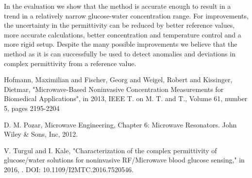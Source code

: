 \documentclass[10pt,final,conference,a4paper,twocolumn]{IEEEtran_AntennEMB_GigaHertz2016}
\begin{document}
In the evaluation we show that the method is accurate enough to result in a trend in a relatively narrow glucose-water concentration range. For improvements, the uncertainty in the permittivity can be reduced by better reference values, more accurate calculations, better concentration and temperature control and a more rigid setup. Despite the many possible improvements we believe that the method as it is can successfully be used to detect anomalies and deviations in complex permittivity from a reference value.







%
%


\begin{thebibliography}{99}
	
	
	
	 Hofmann, Maximilian and Fischer, Georg and Weigel, Robert and Kissinger, Dietmar, "Microwave-Based Noninvasive Concentration Measurements for Biomedical Applications", in 2013, IEEE T. on M. T. and T., Volume 61, number 5, pages 2195-2204
	
	 D. M. Pozar, Microwave Engineering, Chapter 6: Microwave Resonators. John Wiley \& Sons,
	Inc, 2012.
	
	 V. Turgul and I. Kale, "Characterization of the complex permittivity of glucose/water solutions for noninvasive RF/Microwave blood glucose sensing," in 2016, . DOI: 10.1109/I2MTC.2016.7520546.
\end{thebibliography}
\end{document}
